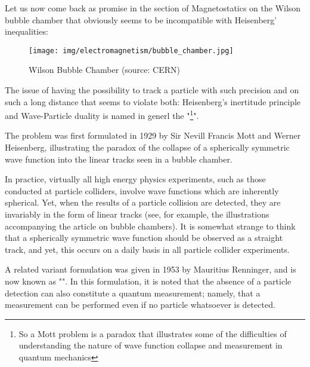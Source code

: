 	Let us now come back as promise in the section of Magnetostatics on the Wilson bubble chamber that obviously seems to be incompatible with Heisenberg' inequalities: 
	\begin{figure}[H]
		\centering
		\texttt{[image: img/electromagnetism/bubble\_chamber.jpg]}
		\caption[]{Wilson Bubble Chamber (source: CERN)}
	\end{figure}
	The issue of having the possibility to track a particle with such precision and on such a long distance that seems to violate both: Heisenberg's inertitude principle and Wave-Particle duality is named in generl the "\footnote{So a Mott problem is a paradox that illustrates some of the difficulties of understanding the nature of wave function collapse and measurement in quantum mechanics}".

	The problem was first formulated in 1929 by Sir Nevill Francis Mott and Werner Heisenberg, illustrating the paradox of the collapse of a spherically symmetric wave function into the linear tracks seen in a bubble chamber.

	In practice, virtually all high energy physics experiments, such as those conducted at particle colliders, involve wave functions which are inherently spherical. Yet, when the results of a particle collision are detected, they are invariably in the form of linear tracks (see, for example, the illustrations accompanying the article on bubble chambers). It is somewhat strange to think that a spherically symmetric wave function should be observed as a straight track, and yet, this occurs on a daily basis in all particle collider experiments.

	A related variant formulation was given in 1953 by Mauritius Renninger, and is now known as "". In this formulation, it is noted that the absence of a particle detection can also constitute a quantum measurement; namely, that a measurement can be performed even if no particle whatsoever is detected.

